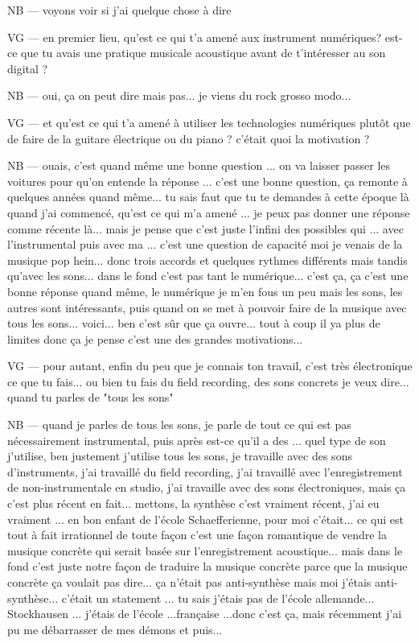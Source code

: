 NB — voyons voir si j'ai quelque chose à dire 

VG — en premier lieu, qu'est ce qui t'a amené aux instrument numériques? est-ce que tu avais une pratique musicale acoustique avant de t'intéresser au son digital ?

NB — oui, ça on peut dire mais pas... je viens du rock grosso modo... 

VG — et qu'est ce qui t'a amené à utiliser les technologies numériques plutôt que de faire de la guitare électrique ou du piano ? c'était quoi la motivation ?

NB — ouais, c'est quand même une bonne question ... on va laisser passer les voitures pour qu'on entende la réponse ... c'est une bonne question, ça remonte à quelques années quand même... tu sais faut que tu te demandes à cette époque là quand j'ai commencé, qu'est ce qui m'a amené ... je peux pas donner une réponse comme récente là... mais je pense que c'est juste l'infini des possibles qui ... avec l'instrumental puis avec ma ... c'est une question de capacité moi je venais de la musique pop hein... donc trois accords et quelques rythmes différents mais tandis qu'avec les sons... dans le fond c'est pas tant le numérique... c'est ça, ça c'est une bonne réponse quand même, le numérique je m'en fous un peu mais les sons, les autres sont intéressants, puis quand on se met à pouvoir faire de la musique avec tous les sons... voici... ben c'est sûr que ça ouvre... tout à coup il ya plus de limites donc ça je pense c'est une des grandes motivations... 

VG — pour autant, enfin du peu que je connais ton travail, c'est très électronique ce que tu fais... ou bien tu fais du field recording, des sons concrets je veux dire... quand tu parles de "tous les sons"

NB — quand je parles de tous les sons, je parle de tout ce qui est pas nécessairement instrumental, puis après est-ce qu'il a des ... quel type de son j'utilise, ben justement j'utilise tous les sons, je travaille avec des sons d'instruments, j'ai travaillé du field recording, j'ai travaillé avec l'enregistrement de non-instrumentale en studio, j'ai travaille avec des sons électroniques, mais ça c'est plus récent en fait... mettons, la synthèse c'est vraiment récent, j'ai eu vraiment ... en bon enfant de l'école Schaefferienne, pour moi c'était... ce qui est tout à fait irrationnel de toute façon c'est une façon romantique de vendre la musique concrète qui serait basée sur l'enregistrement acoustique... mais dans le fond c'est juste notre façon de traduire la musique concrète parce que la musique concrète ça voulait pas dire... ça n'était pas anti-synthèse mais moi j'étais anti-synthèse... c'était un statement ... tu sais j'étais pas de l'école allemande... Stockhausen ... j'étais de l'école ...française ...donc c'est ça, mais récemment j'ai pu me débarrasser de mes démons et puis...

